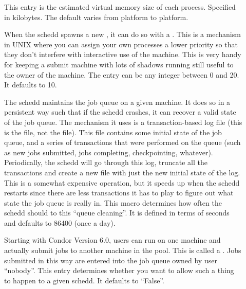 \begin{description}
\item[] \label{param:ShadowSizeEstimate}
  This entry is the estimated virtual memory size of each
   process.  Specified in kilobytes.  The default
  varies from platform to platform.

\item[]
  \label{param:ShadowReniceIncrement} When the schedd spawns a new
  , it can do so with a .  This is a
  mechanism in UNIX where you can assign your own processes a lower 
  priority so that they don't interfere with interactive use of the
  machine.  This is very handy for keeping a submit machine with lots
  of shadows running still useful to the owner of the machine.  The
  entry can be any integer between 0 and 20.  It defaults to 10.

\item[] \label{param:QueueCleanInterval}
  The schedd maintains the job queue on a given machine.  It does so
  in a persistent way such that if the schedd crashes, it can recover
  a valid state of the job queue.  The mechanism it uses is a
  transaction-based log file (this is the  file,
  not the  file).  This file contains some initial
  state of the job queue, and a series of transactions that were
  performed on the queue (such as new jobs submitted, jobs completing,
  checkpointing, whatever).  Periodically, the schedd will go through
  this log, truncate all the transactions and create a new file with
  just the new initial state of the log.  This is a somewhat expensive
  operation, but it speeds up when the schedd restarts since there are
  less transactions it has to play to figure out what state the job
  queue is really in.  This macro determines how often the schedd
  should to this ``queue cleaning''.  It is defined in terms of
  seconds and defaults to 86400 (once a day). 
  
\item[] \label{param:AllowRemoteSubmit}
  Starting with Condor Version 6.0, users can run  on
  one machine and actually submit jobs to another machine in the
  pool.  This is called a .  Jobs submitted in
  this way are entered into the job queue owned by user ``nobody''.
  This entry determines whether you want to allow such a thing to
  happen to a given schedd.  It defaults to ``False''.
     

\end{description}
